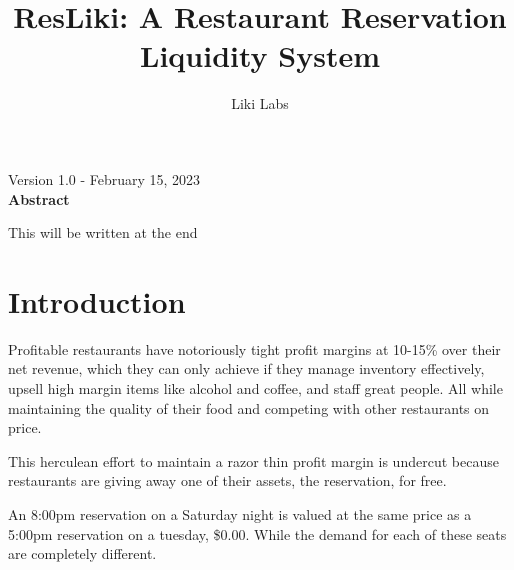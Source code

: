 \documentclass{article}
\title{\Huge ResLiki: A Restaurant Reservation Liquidity System}
\date{\vspace{-5ex}} %
\author{\LARGE Liki Labs}
\begin{document}
	\maketitle
	\begin{center}
		\large Version 1.0 - February 15, 2023\\
		\vspace{25pt}
		\textbf{Abstract}
	\end{center}
		This will be written at the end
	\newpage
	\tableofcontents
	\newpage
	\section{Introduction}
	
	\hspace{1cm} Profitable restaurants have notoriously tight profit margins at 10-15\% over their net revenue, which they can only achieve if they manage inventory effectively, upsell high margin items like alcohol and coffee, and staff great people.  All while maintaining the quality of their food and competing with other restaurants on price.
	
	\hspace{1cm}This herculean effort to maintain a razor thin profit margin is undercut because restaurants are giving away one of their assets, the reservation, for free.
	
	\hspace{1cm}An 8:00pm reservation on a Saturday night is valued at the same price as a 5:00pm reservation on a tuesday, \$0.00.  While the demand for each of these seats are completely different.
	\\
	\begin{center}
	\end{center}
	
\end{document}
